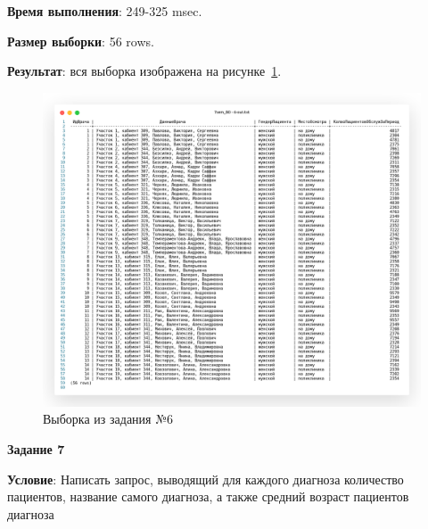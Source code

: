 \textbf{Время выполнения}: 249-325 msec.

\textbf{Размер выборки}: 56 rows.

\textbf{Результат}: вся выборка изображена на рисунке~\ref{fig:t6}.

\begin{figure}[!h]
  \centering

  \includegraphics[width=18cm]
  {../sql/task6/6-out.png}

  \caption{Выборка из задания №6}

  \label{fig:t6}
\end{figure}


\begin{center}
  \textbf{Задание 7}
\end{center}
  
\textbf{Условие}:
Написать запрос, выводящий для каждого диагноза количество пациентов, название
самого диагноза, а также средний возраст пациентов диагноза








